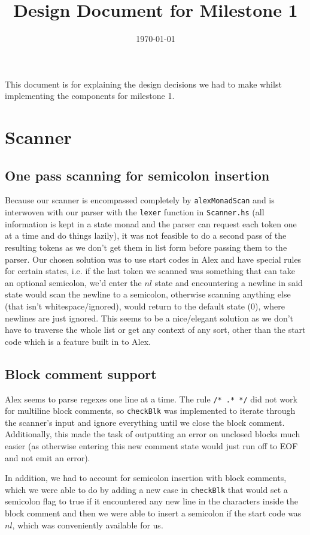 \documentclass[11pt]{article}
\date{\today}
\title{Design Document for Milestone 1}
\begin{document}
\maketitle
\tableofcontents

This document is for explaining the design decisions we had to make
whilst implementing the components for milestone 1.
\section{Scanner}
\label{sec:orgb78fc2f}
\subsection{One pass scanning for semicolon insertion}
\label{sec:orgc62b700}
Because our scanner is encompassed completely by \texttt{alexMonadScan} and
is interwoven with our parser with the \texttt{lexer} function in
\texttt{Scanner.hs} (all information is kept in a state monad and the
parser can request each token one at a time and do things lazily),
it was not feasible to do a second pass of the resulting tokens as
we don't get them in list form before passing them to the
parser. Our chosen solution was to use start codes in Alex and have
special rules for certain states, i.e. if the last token we scanned
was something that can take an optional semicolon, we'd enter the
\(nl\) state and encountering a newline in said state would scan the
newline to a semicolon, otherwise scanning anything else (that isn't
whitespace/ignored), would return to the default state (\(0\)), where
newlines are just ignored. This seems to be a nice/elegant solution
as we don't have to traverse the whole list or get any context of
any sort, other than the start code which is a feature built in to
Alex.
\subsection{Block comment support}
\label{sec:org1e423c7}
Alex seems to parse regexes one line at a time. The rule \texttt{/* .* */}
did not work for multiline block comments, so \texttt{checkBlk} was
implemented to iterate through the scanner's input and ignore
everything until we close the block comment. Additionally, this made
the task of outputting an error on unclosed blocks much easier (as
otherwise entering this new comment state would just run off to EOF
and not emit an error).

In addition, we had to account for semicolon insertion with block
comments, which we were able to do by adding a new case in \texttt{checkBlk}
that would set a semicolon flag to true if it encountered any new line
in the characters inside the block comment and then we were able to
insert a semicolon if the start code was \(nl\), which was conveniently
available for us.
\end{document}
